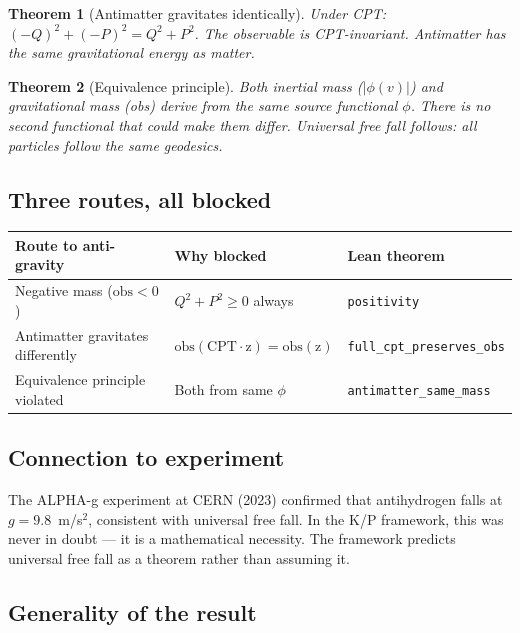 \documentclass[11pt,letterpaper]{article}
\newtheorem{theorem}{Theorem}
\begin{document}
\begin{theorem}[Antimatter gravitates identically]
\label{thm:cpt}
Under CPT: $(-Q)^2 + (-P)^2 = Q^2 + P^2$. The observable is
CPT-invariant. Antimatter has the same gravitational energy as matter.
\end{theorem}

\begin{theorem}[Equivalence principle]
\label{thm:equiv}
Both inertial mass ($|\phi(v)|$) and gravitational mass (obs) derive
from the same source functional $\phi$. There is no second functional
that could make them differ. Universal free fall follows: all particles
follow the same geodesics.
\end{theorem}

\subsection{Three routes, all blocked}

\begin{center}
\begin{tabular}{@{}lll@{}}
\toprule
Route to anti-gravity & Why blocked & Lean theorem \\
\midrule
Negative mass ($\mathrm{obs} < 0$) & $Q^2 + P^2 \geq 0$ always &
  \texttt{positivity} \\
Antimatter gravitates differently & $\mathrm{obs(CPT \cdot z) = obs(z)}$ &
  \texttt{full\_cpt\_preserves\_obs} \\
Equivalence principle violated & Both from same $\phi$ &
  \texttt{antimatter\_same\_mass} \\
\bottomrule
\end{tabular}
\end{center}

\subsection{Connection to experiment}

The ALPHA-g experiment at CERN (2023) confirmed that antihydrogen falls
at $g = 9.8$~m/s$^2$, consistent with universal free fall. In the K/P
framework, this was never in doubt --- it is a mathematical necessity.
The framework predicts universal free fall as a theorem rather than
assuming it.

\subsection{Generality of the result}
\end{document}
